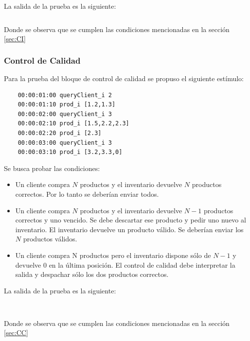 \documentclass[10pt]{article}
\begin{document}
La salida de la prueba es la siguiente:

\begin{minipage}{1\textwidth}
	\centering
	\begin{lstlisting}

	\end{lstlisting}
	
\end{minipage}
Donde se observa que se cumplen las condiciones mencionadas en la sección \ref{sec:CI}

\subsubsection{Control de Calidad}
Para la prueba del bloque de control de calidad se propuso el siguiente estímulo:

\begin{minipage}{1\textwidth}
	\centering
	\begin{lstlisting}
	00:00:01:00 queryClient_i 2
	00:00:01:10 prod_i [1.2,1.3]
	00:00:02:00 queryClient_i 3
	00:00:02:10 prod_i [1.5,2.2,2.3]
	00:00:02:20 prod_i [2.3]
	00:00:03:00 queryClient_i 3
	00:00:03:10 prod_i [3.2,3.3,0]
	\end{lstlisting}
	
	\centering
\end{minipage}

Se busca probar las condiciones:
\begin{itemize}
	\item Un cliente compra $N$ productos y el inventario devuelve $N$ productos correctos. Por lo tanto se deberían enviar todos.
	\item Un cliente compra $N$ productos y el inventario devuelve $N-1$ productos correctos y uno vencido. Se debe descartar ese producto y pedir uno nuevo al inventario. El inventario devuelve un producto válido. Se deberían enviar los $N$ productos válidos.
	\item Un cliente compra N productos pero el inventario dispone sólo de $N-1$ y devuelve $0$ en la última posición. El control de calidad debe interpretar la salida y despachar sólo los dos productos correctos.
\end{itemize}

La salida de la prueba es la siguiente:

\begin{minipage}{1\textwidth}
	\centering
	\begin{lstlisting}
	
	\end{lstlisting}
	
\end{minipage}
Donde se observa que se cumplen las condiciones mencionadas en la sección \ref{sec:CC}
\end{document}
